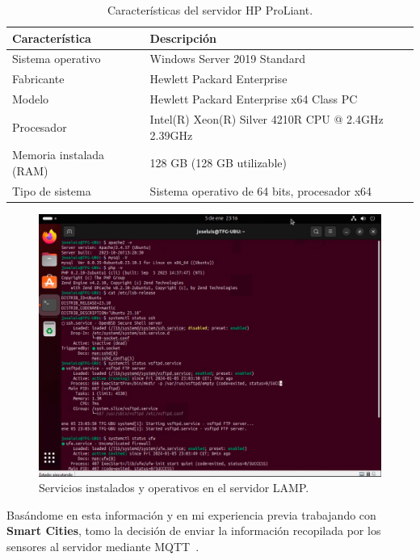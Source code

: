 \begin{table}[htbp]
\begin{center}
\caption{Características del servidor HP ProLiant.}
\begin{tabular}{|l|l|}
\hline
\rowcolor[HTML]{C0C0C0} 
\textbf{Característica} & \textbf{Descripción}\\ \hline
Sistema operativo & Windows Server 2019 Standard\\ \hline
Fabricante & Hewlett Packard Enterprise \\ \hline
Modelo & Hewlett Packard Enterprise x64 Class PC\\ \hline
Procesador & Intel(R) Xeon(R) Silver 4210R CPU @ 2.4GHz 2.39GHz\\ \hline
Memoria instalada (RAM) & 128 GB (128 GB utilizable) \\ \hline
Tipo de sistema & Sistema operativo de 64 bits, procesador x64 \\ \hline
\end{tabular}
\end{center}
\end{table}

\begin{figure}[h]
	\centering
	\includegraphics[width=1\textwidth]{img/desarrollo/LAMP_servicios.png}
	\caption{Servicios instalados y operativos en el servidor LAMP.} \label{Img:LAMP_servicios}
\end{figure}

Basándome en esta información y en mi experiencia previa trabajando con \textbf{Smart Cities}, tomo la decisión de enviar la información recopilada por los sensores al servidor mediante MQTT~\cite{manual:MQTT}. 

